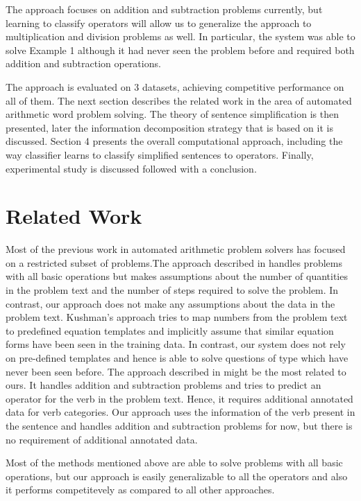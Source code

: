 \documentclass[11pt]{article}
\begin{document}
The approach focuses on addition and subtraction problems currently, but learning to classify operators will allow us to generalize the approach to multiplication and division problems as well. In particular, the system was able to solve Example 1 although it had never seen the problem before and required both addition and subtraction operations.

The approach is evaluated on 3 datasets, achieving competitive performance on all of them. The next section describes the related work in the area of automated arithmetic word problem solving. The theory of sentence simplification is then presented, later the information decomposition strategy that is based on it is discussed. Section 4 presents the overall computational approach, including the way classifier learns to classify simplified sentences to operators. Finally, experimental study is discussed followed with a conclusion.

\section{Related Work}
Most of the previous work in automated arithmetic problem solvers has focused on a restricted subset of problems.The approach described in \citep{RoyTACL15} handles problems with all basic operations but makes assumptions about the number of quantities in the problem text and the number of steps required to solve the problem. In contrast, our approach does not make any assumptions about the data in the problem text. Kushman's approach \citep{Kushman} tries to map numbers from the problem text to predefined equation templates and implicitly assume that similar equation forms have been seen in the training data. In contrast, our system does not rely on pre-defined templates and hence is able to solve questions of type which have never been seen before.  The approach described in \citep{ARIS} might be the most related to ours. It handles addition and subtraction problems and tries to predict an operator for the verb in the problem text. Hence, it requires additional annotated data for verb categories. Our approach uses the information of the verb present in the sentence and handles addition and subtraction problems for now, but there is no requirement of additional annotated data. 

Most of the methods mentioned above are able to solve problems with all basic operations, but our approach is easily generalizable to all the operators and also it performs competitevely as compared to all other approaches. 
\end{document}
